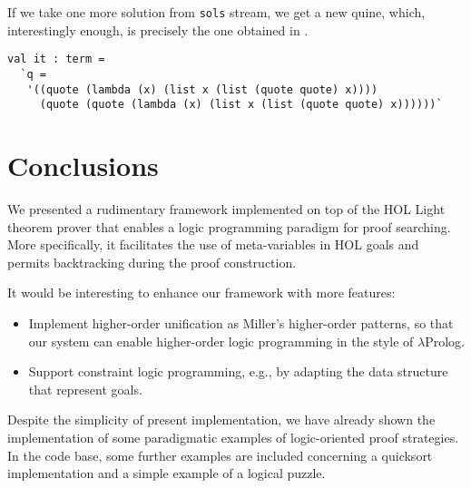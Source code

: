If we take one more solution from \verb|sols| stream, we get a new
quine, which, interestingly enough, is precisely the one obtained in
\citep{Byrd:2012:MLU:2661103.2661105}.
\begin{verbatim}
val it : term =
  `q =
   '((quote (lambda (x) (list x (list (quote quote) x))))
     (quote (quote (lambda (x) (list x (list (quote quote) x))))))`
\end{verbatim}

\section*{Conclusions}
\label{sec:conclusions}

We presented a rudimentary framework implemented on top of the HOL
Light theorem prover that enables a logic programming paradigm for
proof searching.  More specifically, it facilitates the use of
meta-variables in HOL goals and permits backtracking during the proof
construction.

It would be interesting to enhance our framework with more features:
\begin{itemize}
\item Implement higher-order unification as Miller's higher-order
  patterns, so that our system can enable higher-order logic
  programming in the style of $\lambda$Prolog.
\item Support constraint logic programming, e.g., by adapting the data
  structure that represent goals.
\end{itemize}

Despite the simplicity of present implementation, we have already
shown the implementation of some paradigmatic examples of
logic-oriented proof strategies.  In the code base, some further
examples are included concerning a quicksort implementation and a
simple example of a logical puzzle.

